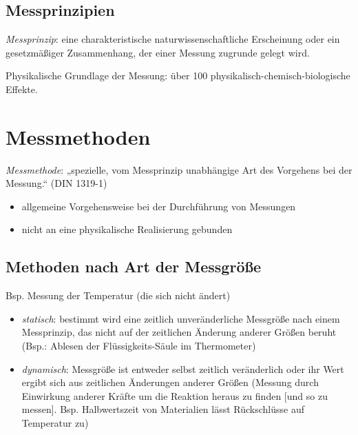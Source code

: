 \subsection{Messprinzipien}
\emph{Messprinzip}: eine charakteristische naturwissenschaftliche Erscheinung oder ein gesetzmäßiger Zusammenhang, der einer Messung zugrunde gelegt wird.

Physikalische Grundlage der Messung: über 100 physikalisch-chemisch-biologische Effekte.

\section{Messmethoden}
\emph{Messmethode}: „spezielle, vom Messprinzip unabhängige Art des Vorgehens bei der Messung.“ (DIN 1319-1)
\begin{itemize}
\item allgemeine Vorgehensweise bei der Durchführung von Messungen
\item nicht an eine physikalische Realisierung gebunden
\end{itemize}

\subsection{Methoden nach Art der Messgröße}
Bsp. Messung der Temperatur (die sich nicht ändert)
\begin{itemize}
\item \emph{statisch}: bestimmt wird eine zeitlich unveränderliche Messgröße nach einem Messprinzip, das nicht auf der zeitlichen Änderung anderer Größen beruht (Bsp.: Ablesen der Flüssigkeits-Säule im Thermometer)
\item \emph{dynamisch}: Messgröße ist entweder selbst zeitlich veränderlich oder ihr Wert ergibt sich aus zeitlichen Änderungen anderer Größen (Messung durch Einwirkung anderer Kräfte um die Reaktion heraus zu finden [und so zu messen]. Bsp. Halbwertszeit von Materialien lässt Rückschlüsse auf Temperatur zu)
\end{itemize}

